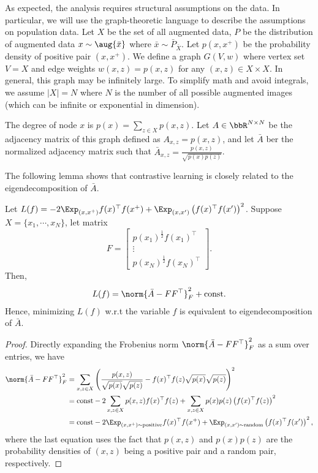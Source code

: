 As expected, the analysis requires structural assumptions on the data. In particular, we will use the graph-theoretic language to describe the assumptions on population data. Let $X$ be the set of all augmented data, $P$ be the distribution of augmented data $x\sim\aug{\bar{x}}$ where $\bar{x}\sim\bar{P}_{\bar{X}}$. Let $p(x, x^+)$ be the probability density of positive pair $(x, x^+)$. We define a graph $G(V, w)$ where vertex set $V=X$ and edge weights $w(x, z) = p(x, z)$ for any $(x, z) \in X\times X$. In general, this graph may be infinitely large. To simplify math and avoid integrals, we assume $|X|=N$ where $N$ is the number of all possible augmented images (which can be infinite or exponential in dimension). 

The degree of node $x$ is $p(x) = \sum_{z\in X} p(x, z)$.  Let $A\in\bbR^{N\times N}$ be the adjacency matrix of this graph defined as $A_{x, z} = p(x, z)$, and let $\bar{A}$ ber the normalized adjacency matrix such that $\bar{A}_{x, z} = \frac{p(x, z)}{\sqrt{p(x)p(z)}}$. 

The following lemma shows that contrastive learning is closely related to the eigendecomposition of $\bar{A}$. 
\begin{lemma}\label{lemma:scl_as_decomposition}
	Let $L(f) = -2\Exp_{(x, x^+) } f(x)^\top f(x^+) + \Exp_{(x, x') } \left(f(x)^\top f(x')\right)^2$.  Suppose $X=\{x_1, \cdots, x_N\}$, let matrix 
	\begin{equation}
	    F = \begin{bmatrix}  p(x_1)^{\frac{1}{2}} f(x_1)^\top  \\ \vdots \\  p(x_N)^{\frac{1}{2}} f(x_N)^\top \end{bmatrix}.
	\end{equation}
	Then,
	\begin{align}
		L(f) = \norm{\bar{A}-FF^\top}_F^2 +\text{const}.
	\end{align}
	Hence, minimizing $L(f)$ w.r.t the variable $f$ is equivalent to eigendecomposition of $\bar{A}$. 
\end{lemma}
\begin{proof}
Directly expanding the Frobenius norm $\norm{\bar{A}-FF^\top}_F^2$ as a sum over entries, we have
\begin{align}
	\norm{\bar{A} - FF^\top}_F^2 &= \sum_{x, z\in X} \left(\frac{p(x, z)}{\sqrt{p(x)}\sqrt{p(z)}} - f(x)^\top f(z) \sqrt{p(x)}\sqrt{p(z)}\right)^2\\
	&= \text{const} -2 \sum_{x, z\in X} p(x, z) f(x)^\top f(z) + \sum_{x, z\in X}p(x)p(z)\left(f(x)^\top f(z)\right)^2\\
	&= \text{const} -2\Exp_{(x, x^+) \sim\text{positive}} f(x)^\top f(x^+) + \Exp_{(x, x') \sim\text{random}}  \left(f(x)^\top f(x')\right)^2,
\end{align}
where the last equation uses the fact that $p(x, z)$ and $p(x)p(z)$ are the probability densities of $(x,z)$ being a positive pair and a random pair, respectively. 
\end{proof}

